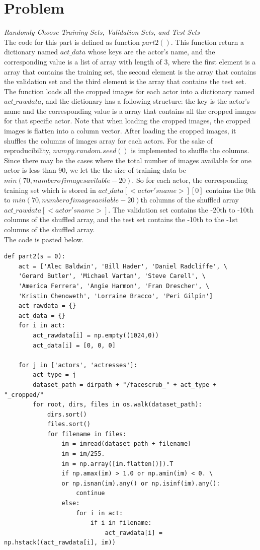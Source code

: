 \documentclass{article}
\newcommand{\enterProblemHeader}[1]{
}
\newcommand{\exitProblemHeader}[1]{
}
\newcounter{homeworkProblemCounter} %
\newcommand{\homeworkProblemName}{}
\newenvironment{homeworkProblem}[1][Problem \arabic{homeworkProblemCounter}]{ %
\stepcounter{homeworkProblemCounter} %
\renewcommand{\homeworkProblemName}{#1} %
\section{\homeworkProblemName} %
\enterProblemHeader{\homeworkProblemName} %
}{
\exitProblemHeader{\homeworkProblemName} %
}
\begin{document}
\begin{homeworkProblem}
\noindent \textit{Randomly Choose Training Sets, Validation Sets, and Test Sets}\\
The code for this part is defined as function $part2()$. This function return a dictionary named $act\_data$ whose keys are the actor's name, and the corresponding value is a list of array with length of 3, where the first element is a array that contains the training set, the second element is the array that contains the validation set and the third element is the array that contains the test set.\\

The function loads all the cropped images for each actor into a dictionary named $act\_rawdata$, and the dictionary has a following structure: the key is the actor's name and the corresponding value is a array that contains all the cropped images for that specific actor. Note that when loading the cropped images, the cropped images is flatten into a column vector. After loading the cropped images, it shuffles the columns of images array for each actors. For the sake of reproducibility, $numpy.random.seed()$ is implemented to shuffle the columns. Since there may be the cases where the total number of images available for one actor is less than 90, we let the the size of training data be $min(70, number of images avilable - 20)$. So for each actor, the corresponding training set which is stored in $act\_data[<actor's name>][0]$ contains the 0th to $min(70, number of images avilable - 20)$th columns of the shuffled array $act\_rawdata[<actor's name>]$. The validation set contains the -20th to -10th columns of the shuffled array, and the test set contains the -10th to the -1st columns of the shuffled array.\\

The code is pasted below.

\begin{lstlisting}
def part2(s = 0):
    act = ['Alec Baldwin', 'Bill Hader', 'Daniel Radcliffe', \
    'Gerard Butler', 'Michael Vartan', 'Steve Carell', \
    'America Ferrera', 'Angie Harmon', 'Fran Drescher', \
    'Kristin Chenoweth', 'Lorraine Bracco', 'Peri Gilpin']
    act_rawdata = {}
    act_data = {}
    for i in act:
        act_rawdata[i] = np.empty((1024,0))
        act_data[i] = [0, 0, 0]

    for j in ['actors', 'actresses']:
        act_type = j
        dataset_path = dirpath + "/facescrub_" + act_type + "_cropped/"
        for root, dirs, files in os.walk(dataset_path):
            dirs.sort()
            files.sort()
            for filename in files:
                im = imread(dataset_path + filename)
                im = im/255.
                im = np.array([im.flatten()]).T
                if np.amax(im) > 1.0 or np.amin(im) < 0. \
                or np.isnan(im).any() or np.isinf(im).any():
                    continue
                else:
                    for i in act:
                        if i in filename:
                            act_rawdata[i] = np.hstack((act_rawdata[i], im))


\end{lstlisting}
\end{homeworkProblem}
\end{document}
